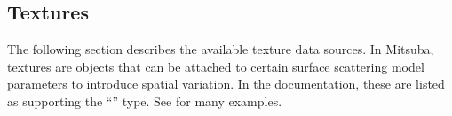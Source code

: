 \newpage
\subsection{Textures}
\label{sec:textures}
The following section describes the available texture data sources. In Mitsuba,
textures are objects that can be attached to certain
surface scattering model parameters to introduce spatial variation.
In the documentation, these are listed as supporting the ``\Texture'' type.
See  for many examples.

